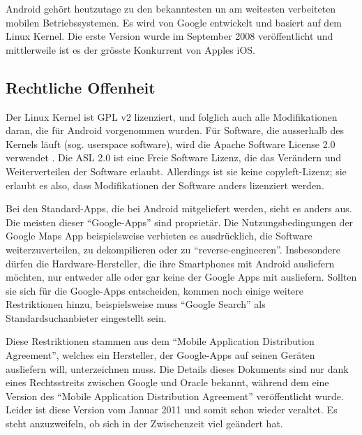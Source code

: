 Android gehört heutzutage zu den bekanntesten un am weitesten verbeiteten mobilen Betriebssystemen. Es wird von Google entwickelt und basiert auf dem Linux Kernel. Die erste Version wurde im September 2008 veröffentlicht und mittlerweile ist es der grösste Konkurrent von Apples iOS. \\

\subsection{Rechtliche Offenheit}
Der Linux Kernel ist GPL v2 lizenziert\cite{online:kernel-license}, und folglich auch alle Modifikationen daran, die für Android vorgenommen wurden. Für Software, die ausserhalb des Kernels läuft (sog. userspace software), wird die Apache Software License 2.0 verwendet \cite{online:android-licenses}. Die ASL 2.0 ist eine Freie Software Lizenz, die das Verändern und Weiterverteilen der Software erlaubt. Allerdings ist sie  keine copyleft-Lizenz; sie erlaubt es also, dass Modifikationen der Software anders lizenziert werden\cite{online:apache-license}.

Bei den Standard-Apps, die bei Android mitgeliefert werden, sieht es anders aus. Die meisten dieser ``Google-Apps'' sind proprietär. Die Nutzungsbedingungen der Google Maps App beispielsweise verbieten es ausdrücklich, die Software weiterzuverteilen, zu dekompilieren oder zu ``reverse-engineeren''\cite{online:google-maps-tos}. Insbesondere dürfen die Hardware-Hersteller, die ihre Smartphones mit Android ausliefern möchten, nur entweder alle oder gar keine der Google Apps mit ausliefern. Sollten sie sich für die Google-Apps entscheiden, kommen noch einige weitere Restriktionen hinzu, beispielsweise muss ``Google Search'' als Standardsuchanbieter eingestellt sein\cite{online:mada-leak}.

Diese Restriktionen stammen aus dem ``Mobile Application Distribution Agreement'', welches ein Hersteller, der Google-Apps auf seinen Geräten ausliefern will, unterzeichnen muss. Die Details dieses Dokuments sind nur dank eines Rechtsstreits zwischen Google und Oracle bekannt, während dem eine Version des ``Mobile Application Distribution Agreement'' veröffentlicht wurde\cite{online:ars-mada-leak}. Leider ist diese Version vom Januar 2011 und somit schon wieder veraltet. Es steht anzuzweifeln, ob sich in der Zwischenzeit viel geändert hat. \\

